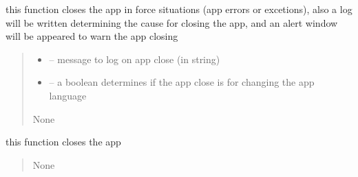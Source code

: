 \documentclass[letterpaper,10pt,english]{sphinxmanual}
\begin{document}
\begin{savenotes}
\begin{fulllineitems}
\begin{savenotes}
\begin{fulllineitems}
\begin{quote}
\begin{description}
\end{description}\end{quote}

\end{fulllineitems}\end{savenotes}


\begin{savenotes}\begin{fulllineitems}
\label{\detokenize{setting/setting_UI:oxin.setting_UI.UI_main_window.close_app_force}}
\pysigstartsignatures
{}
\pysigstopsignatures
\sphinxAtStartPar
this function closes the app in force situations (app errors or excetions), also a log will be written determining the cause
for closing the app, and an alert window will be appeared to warn the app closing
\begin{quote}\begin{description}
\begin{itemize}
\item {} 
\sphinxAtStartPar
{} – message to log on app close (in string)

\item {} 
\sphinxAtStartPar
{} – a boolean determines if the app close is for changing the app language

\end{itemize}

\sphinxAtStartPar
None

\end{description}\end{quote}

\end{fulllineitems}\end{savenotes}


\begin{savenotes}\begin{fulllineitems}
\label{\detokenize{setting/setting_UI:oxin.setting_UI.UI_main_window.close_win}}
\pysigstartsignatures
{}
\pysigstopsignatures
\sphinxAtStartPar
this function closes the app
\begin{quote}\begin{description}
\sphinxAtStartPar
None


\end{description}
\end{quote}
\end{fulllineitems}
\end{savenotes}
\end{fulllineitems}
\end{savenotes}
\end{document}
